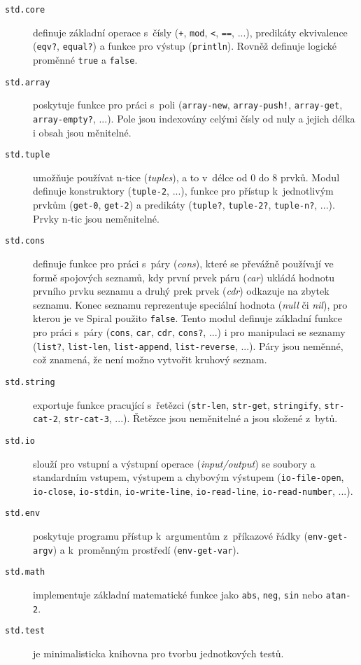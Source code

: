 \begin{description}
  \item[\texttt{std.core}] definuje základní operace s~čísly (\texttt{+},
    \texttt{mod}, \texttt{<}, \texttt{==}, ...), predikáty ekvivalence
    (\texttt{eqv?}, \texttt{equal?}) a funkce pro výstup (\texttt{println}).
    Rovněž definuje logické proměnné \texttt{true} a \texttt{false}.

  \item[\texttt{std.array}] poskytuje funkce pro práci s~poli
    (\texttt{array-new}, \texttt{array-push!}, \texttt{array-get},
    \texttt{array-empty?}, ...). Pole jsou indexovány celými čísly od nuly a
    jejich délka i obsah jsou měnitelné.

  \item[\texttt{std.tuple}] umožňuje používat n-tice (\emph{tuples}), a to
    v~délce od 0 do 8 prvků. Modul definuje konstruktory (\texttt{tuple-2},
    ...), funkce pro přístup k~jednotlivým prvkům (\texttt{get-0},
    \texttt{get-2}) a predikáty (\texttt{tuple?}, \texttt{tuple-2?},
    \texttt{tuple-n?}, ...). Prvky n-tic jsou neměnitelné.

  \item[\texttt{std.cons}] definuje funkce pro práci s~páry (\emph{cons}), které
    se převážně používají ve formě spojových seznamů, kdy první prvek páru
    (\emph{car}) ukládá hodnotu prvního prvku seznamu a druhý prek prvek
    (\emph{cdr}) odkazuje na zbytek seznamu. Konec seznamu reprezentuje
    speciální hodnota (\emph{null} či \emph{nil}), pro kterou je ve Spiral
    použito \texttt{false}. Tento modul definuje základní funkce pro práci
    s~páry (\texttt{cons}, \texttt{car}, \texttt{cdr}, \texttt{cons?}, ...) i
    pro manipulaci se seznamy (\texttt{list?}, \texttt{list-len},
    \texttt{list-append}, \texttt{list-reverse}, ...). Páry jsou neměnné, což
    znamená, že není možno vytvořit kruhový seznam.

  \item[\texttt{std.string}] exportuje funkce pracující s~řetězci
    (\texttt{str-len}, \texttt{str-get}, \texttt{stringify}, \texttt{str-cat-2},
    \texttt{str-cat-3}, ...). Řetězce jsou neměnitelné a jsou složené z~bytů.

  \item[\texttt{std.io}] slouží pro vstupní a výstupní operace
    (\emph{input/output}) se soubory a standardním vstupem, výstupem a chybovým
    výstupem (\texttt{io-file-open}, \texttt{io-close}, \texttt{io-stdin},
    \texttt{io-write-line}, \texttt{io-read-line}, \texttt{io-read-number},
    ...).

  \item[\texttt{std.env}] poskytuje programu přístup k~argumentům z~příkazové
    řádky (\texttt{env-get-argv}) a k~proměnným prostředí (\texttt{env-get-var}).

  \item[\texttt{std.math}] implementuje základní matematické funkce jako
    \texttt{abs}, \texttt{neg}, \texttt{sin} nebo \texttt{atan-2}.

  \item[\texttt{std.test}] je minimalisticka knihovna pro tvorbu jednotkových
    testů.
\end{description}

